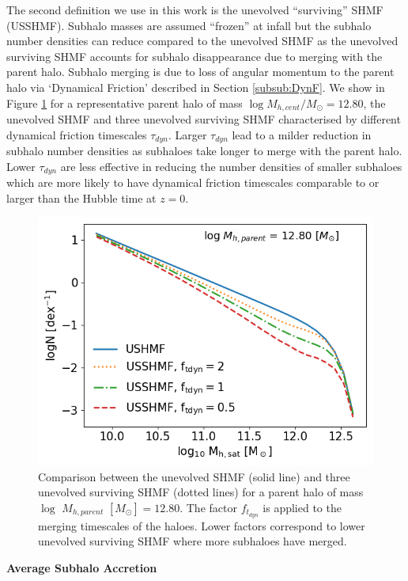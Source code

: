 The second definition we use in this work is the unevolved ``surviving'' SHMF (USSHMF). Subhalo masses are assumed ``frozen'' at infall but the subhalo number densities can reduce compared to the unevolved SHMF as the unevolved surviving SHMF accounts for subhalo disappearance due to merging with the parent halo. Subhalo merging is due to loss of angular momentum to the parent halo via `Dynamical Friction' described in Section \ref{subsub:DynF}. We show in Figure \ref{fig:SHMF_clus} for a representative parent halo of mass $\log M_{h,cent} / M_{\odot} = 12.80$, the unevolved SHMF and three unevolved surviving SHMF characterised by different dynamical friction timescales $\tau_{dyn}$. Larger $\tau_{dyn}$ lead to a milder reduction in subhalo number densities as subhaloes take longer to merge with the parent halo. Lower $\tau_{dyn}$ are less effective in reducing the number densities of smaller subhaloes which are more likely to have dynamical friction timescales comparable to or larger than the Hubble time at $z = 0$.
\begin{figure}[h!]
    \centering
    \includegraphics[width = \linewidth]{Figures/Chapter2/SHMF_OneCluster.png}
    \caption{Comparison between the unevolved SHMF (solid line) and three unevolved surviving SHMF  (dotted lines) for a parent halo of mass $\log$ $M_{h,parent}$ $[M_{\odot}] = 12.80$. The factor $f_{t_{dyn}}$ is applied to the merging timescales of the haloes. Lower factors correspond to lower unevolved surviving SHMF where more subhaloes have merged.}
    \label{fig:SHMF_clus}
\end{figure}

\textbf{Average Subhalo Accretion}

